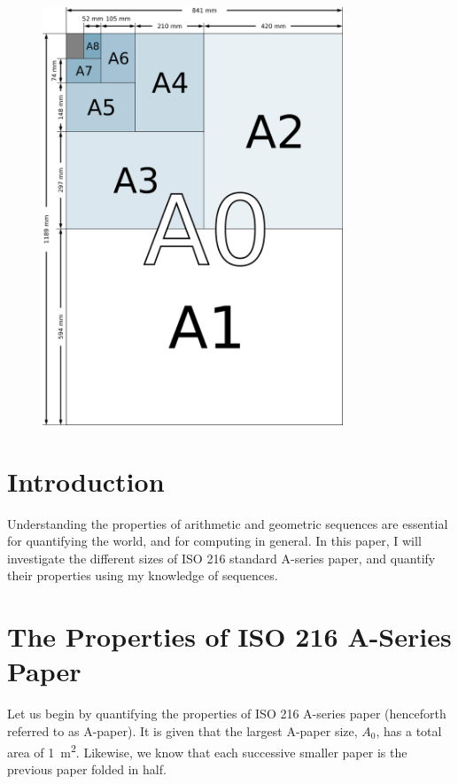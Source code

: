 
\begin{figure}[H]
  \centering
  \includegraphics[angle=270,origin=c,width=0.8\textwidth]{includes/A-paper-eps}
\end{figure}

\section*{Introduction}
Understanding the properties of arithmetic and geometric sequences are essential for quantifying the world, and for computing in general. In this paper, I will investigate the different sizes of ISO 216 standard A-series paper, and quantify their properties using my knowledge of sequences.

\section*{The Properties of ISO 216 A-Series Paper}
Let us begin by quantifying the properties of ISO 216 A-series paper (henceforth referred to as A-paper). It is given that the largest A-paper size, $A_{0}$, has a total area of \SI{1}{\metre\squared}. Likewise, we know that each successive smaller paper is the previous paper folded in half.

